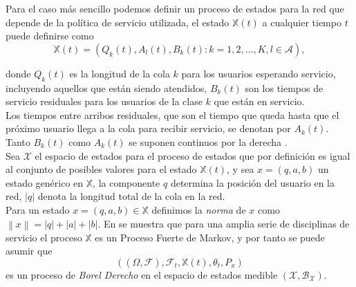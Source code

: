 
Para el caso m\'as sencillo podemos definir un proceso de estados
para la red que depende de la pol\'itica de servicio utilizada, el
estado $\mathbb{X}\left(t\right)$ a cualquier tiempo $t$ puede
definirse como
\begin{equation}\label{Eq.Esp.Estados}
\mathbb{X}\left(t\right)=\left(Q_{k}\left(t\right),A_{l}\left(t\right),B_{k}\left(t\right):k=1,2,\ldots,K,l\in\mathcal{A}\right),
\end{equation}

donde $Q_{k}\left(t\right)$ es la longitud de la cola $k$ para los
usuarios esperando servicio, incluyendo aquellos que est\'an
siendo atendidos, $B_{k}\left(t\right)$ son los tiempos de
servicio residuales para los usuarios de la clase $k$ que est\'an
en servicio.\\

Los tiempos entre arribos residuales, que son el tiempo que queda
hasta que el pr\'oximo usuario llega a la cola para recibir
servicio, se denotan por $A_{k}\left(t\right)$. Tanto
$B_{k}\left(t\right)$ como $A_{k}\left(t\right)$ se suponen
continuos por la derecha \cite{Dai2}.\\

Sea $\mathcal{X}$ el espacio de estados para el proceso de estados
que por definici\'on es igual  al conjunto de posibles valores
para el estado $\mathbb{X}\left(t\right)$, y sea
$x=\left(q,a,b\right)$ un estado gen\'erico en $\mathbb{X}$, la
componente $q$ determina la posici\'on del usuario en la red,
$|q|$ denota la longitud total de la cola en la red.\\

Para un estado $x=\left(q,a,b\right)\in\mathbb{X}$ definimos la
{\em norma} de $x$ como $\left\|x\right\|=|q|+|a|+|b|$. En
\cite{Dai} se muestra que para una amplia serie de disciplinas de
servicio el proceso $\mathbb{X}$ es un Proceso Fuerte de Markov, y
por tanto se puede asumir que
\[\left(\left(\Omega,\mathcal{F}\right),\mathcal{F}_{t},\mathbb{X}\left(t\right),\theta_{t},P_{x}\right)\]
es un proceso de {\em Borel Derecho} en el espacio de estados
medible $\left(\mathcal{X},\mathcal{B}_{\mathcal{X}}\right)$.\\

